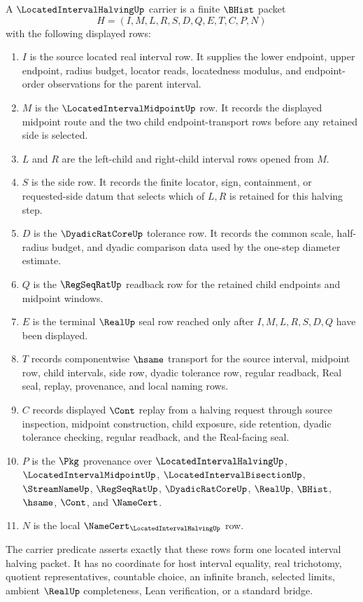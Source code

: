 \begin{definition}
\label{def:located-interval-halving-carrier}
A $\LocatedIntervalHalvingUp$ carrier is a finite $\BHist$ packet
$$
H=(I,M,L,R,S,D,Q,E,T,C,P,N)
$$
with the following displayed rows:
\begin{enumerate}
\item $I$ is the source located real interval row. It supplies the lower endpoint, upper endpoint, radius budget, locator reads, locatedness modulus, and endpoint-order observations for the parent interval.
\item $M$ is the $\LocatedIntervalMidpointUp$ row. It records the displayed midpoint route and the two child endpoint-transport rows before any retained side is selected.
\item $L$ and $R$ are the left-child and right-child interval rows opened from $M$.
\item $S$ is the side row. It records the finite locator, sign, containment, or requested-side datum that selects which of $L,R$ is retained for this halving step.
\item $D$ is the $\DyadicRatCoreUp$ tolerance row. It records the common scale, half-radius budget, and dyadic comparison data used by the one-step diameter estimate.
\item $Q$ is the $\RegSeqRatUp$ readback row for the retained child endpoints and midpoint windows.
\item $E$ is the terminal $\RealUp$ seal row reached only after $I,M,L,R,S,D,Q$ have been displayed.
\item $T$ records componentwise $\hsame$ transport for the source interval, midpoint row, child intervals, side row, dyadic tolerance row, regular readback, Real seal, replay, provenance, and local naming rows.
\item $C$ records displayed $\Cont$ replay from a halving request through source inspection, midpoint construction, child exposure, side retention, dyadic tolerance checking, regular readback, and the Real-facing seal.
\item $P$ is the $\Pkg$ provenance over $\LocatedIntervalHalvingUp$, $\LocatedIntervalMidpointUp$, $\LocatedIntervalBisectionUp$, $\StreamNameUp$, $\RegSeqRatUp$, $\DyadicRatCoreUp$, $\RealUp$, $\BHist$, $\hsame$, $\Cont$, and $\NameCert$.
\item $N$ is the local $\NameCert_{\LocatedIntervalHalvingUp}$ row.
\end{enumerate}
The carrier predicate asserts exactly that these rows form one located interval halving packet. It has no coordinate for host interval equality, real trichotomy, quotient representatives, countable choice, an infinite branch, selected limits, ambient $\RealUp$ completeness, Lean verification, or a standard bridge.
\end{definition}

